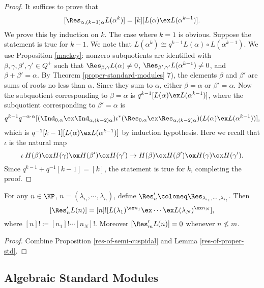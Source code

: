 \begin{proof}
    It suffices to prove that $$[\Res_{\alpha,(k-1)\alpha}L(\alpha^k)]
     = [k][L(\alpha)\ex L(\alpha^{k-1})].$$
    We prove this by induction on $k$. The case where $k = 1$ is
    obvious. Suppose the statement is true for $k-1$. We note that
    $L(\alpha^k)\cong q^{k-1}L(\alpha)\circ L(\alpha^{k-1})$.
    We use Proposition \ref{mackey}: nonzero subquotients are 
    identified with $\beta,\gamma,\beta',\gamma'\in Q^+$ such that
    $\Res_{\beta,\gamma}L(\alpha)\ne 0$, $\Res_{\beta',\gamma'}
    L(\alpha^{k-1})\ne 0$, and $\beta+\beta' = \alpha$. By Theorem
    \ref{proper-standard-modules} 7), the elements $\beta$ and $\beta'$ are sums 
    of roots no less than $\alpha$. Since they sum to $\alpha$,
    either $\beta = \alpha$ or $\beta' = \alpha$. Now the subquotient
    corresponding to $\beta = \alpha$ is $q^{k-1}[L(\alpha)\ex 
    L(\alpha^{k-1})]$, where the subquotient
    corresponding to $\beta' = \alpha$ is 
    \[
        q^{k-1} q^{-\alpha\cdot\alpha}
        [(\Ind_{0,\alpha}\ex\Ind_{\alpha,(k-2)\alpha})\iota^*
        (\Res_{0,\alpha}\ex\Res_{\alpha,(k-2)\alpha})(L(\alpha)\ex 
        L(\alpha^{k-1}))],
    \]    
    which is $q^{-1}[k-1][L(\alpha)\ex 
    L(\alpha^{k-1})]$ by induction hypothesis.
    Here we recall that $\iota$ is the natural map 
    \[
        \iota\:H(\beta)\ox H(\gamma)\ox H(\beta')\ox H(\gamma')
        \to H(\beta)\ox H(\beta')\ox H(\gamma)\ox H(\gamma').
    \] 
    Since
    $q^{k-1}+q^{-1}[k-1] = [k]$, the statement is true for $k$,
    completing the proof.
\end{proof}

\begin{corollary}\label{res'}
    For any $n\in\KP$, $n = (\lambda_{i_1},\cdots,\lambda_{i_l})$,
    define $\Res_n' \coloneq  \Res_{\lambda_{i_1},\cdots,\lambda_{i_l}}$. 
    Then 
    \[
        [\Res_n'L(n)] = [n]![L(\lambda_1)^{\ex n_1}\ex\cdots
        \ex L(\lambda_N)^{\ex n_N}],
    \]    
    where $[n]! \coloneq  [n_1]!\cdots[n_N]!$. Moreover $[\Res_m'L(n)] = 0$
    whenever $n\not\le m$.
\end{corollary}

\begin{proof}
    Combine Proposition \ref{res-of-semi-cuspidal} and Lemma 
    \ref{res-of-proper-std}.
\end{proof}

\subsection{Algebraic Standard Modules}

